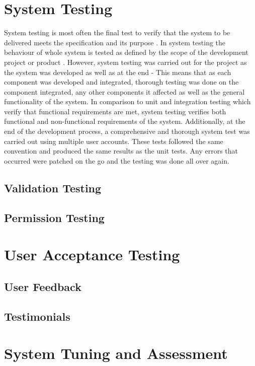 \section{System Testing}
System testing is most often the final test to verify that the system to be delivered meets the specification and its purpose \cite{ISTQB:SystemTesting}. In system testing the behaviour of whole system is tested as defined by the scope of the development project or product \cite{ISTQB:SystemTesting}. However, system testing was carried out for the project as the system was developed as well as at the end - This means that as each component was developed and integrated, thorough testing was done on the component integrated, any other components it affected as well as the general functionality of the system. In comparison to unit and integration testing which verify that functional requirements are met, system testing verifies both functional and non-functional requirements of the system. Additionally, at the end of the development process, a comprehensive and thorough system test was carried out using multiple user accounts. These tests followed the same convention and produced the same results as the unit tests. Any errors that occurred were patched on the go and the testing was done all over again.

\subsection{Validation Testing}
\subsection{Permission Testing}

\section{User Acceptance Testing}
\subsection{User Feedback}
\subsection{Testimonials}

\section{System Tuning and Assessment}
